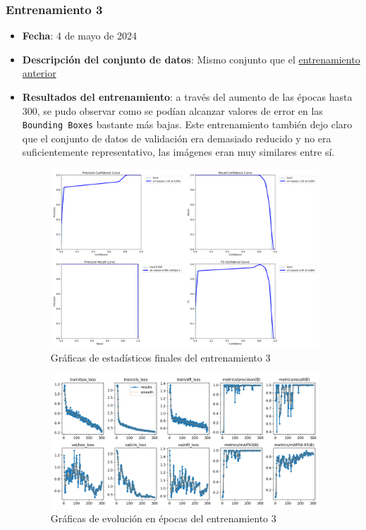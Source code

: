 \subsubsection*{Entrenamiento 3}
\label{train:3}
\begin{itemize}
    \item \textbf{Fecha}: 4 de mayo de 2024
    \item \textbf{Descripción del conjunto de datos}: Mismo conjunto que el \hyperref[train:2]{entrenamiento anterior}
    \item \textbf{Resultados del entrenamiento}: a través del aumento de las épocas hasta 300, se pudo observar como se podían alcanzar valores de error en las \texttt{Bounding Boxes} bastante más bajas. 
    Este entrenamiento también dejo claro que el conjunto de datos de validación era demasiado reducido y no era suficientemente representativo, las imágenes eran muy similares entre sí.

    \begin{figure}[H]
        \centering
        \includegraphics[width=0.95\textwidth]{images/13/b/3/graficas2.png}
        \caption{Gráficas de estadísticos finales del entrenamiento 3}
        \label{fig:Estadisticos3}
    \end{figure}
    \begin{figure}[H]
        \centering
        \includegraphics[width=0.95\textwidth]{images/13/b/3/results.png}
        \caption{Gráficas de evolución en épocas del entrenamiento 3}
        \label{fig:Resultados3}
    \end{figure}
\end{itemize}
\clearpage
